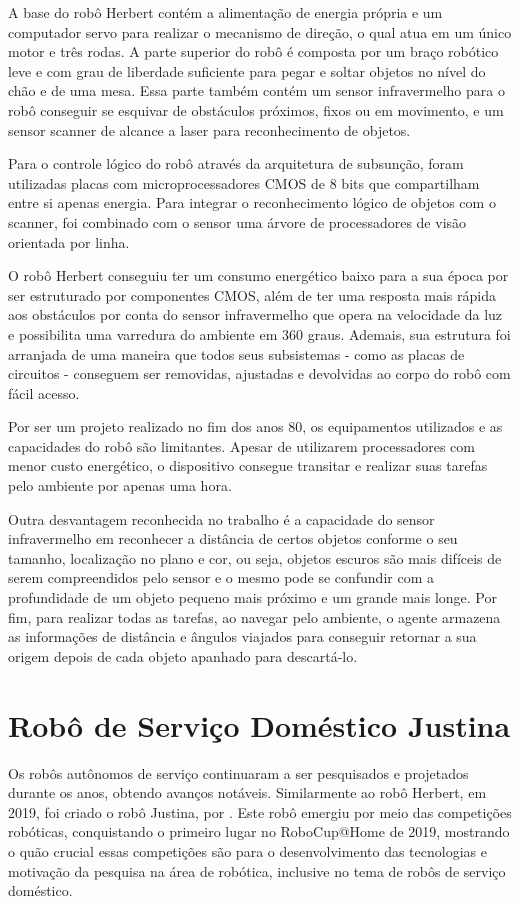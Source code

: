 A base do robô Herbert contém a alimentação de energia própria e um computador servo para realizar o mecanismo de direção, o qual atua em um único motor e três rodas. A parte superior do robô é composta por um braço robótico leve e com grau de liberdade suficiente para pegar e soltar objetos no nível do chão e de uma mesa. Essa parte também contém um sensor infravermelho para o robô conseguir se esquivar de obstáculos próximos, fixos ou em movimento, e um sensor scanner de alcance a laser para reconhecimento de objetos. 

Para o controle lógico do robô através da arquitetura de subsunção, foram utilizadas placas com microprocessadores CMOS de 8 bits  que compartilham entre si apenas energia. Para integrar o reconhecimento lógico de objetos com o scanner, foi combinado com o sensor uma árvore de processadores de visão orientada por linha. 

O robô Herbert conseguiu ter um consumo energético baixo para a sua época por ser estruturado por componentes CMOS, além de ter uma resposta mais rápida aos obstáculos por conta do sensor infravermelho que opera na velocidade da luz e possibilita uma varredura do ambiente em 360 graus. Ademais, sua estrutura foi arranjada de uma maneira que todos seus subsistemas - como as placas de circuitos -  conseguem ser removidas, ajustadas e devolvidas ao corpo do robô com fácil acesso. 

Por ser um projeto realizado no fim dos anos 80, os equipamentos utilizados e as capacidades do robô são limitantes. Apesar de utilizarem processadores com menor custo energético, o dispositivo consegue transitar e realizar suas tarefas pelo ambiente por apenas uma hora. 

Outra desvantagem reconhecida no trabalho é a capacidade do sensor infravermelho em reconhecer a distância de certos objetos conforme o seu tamanho, localização no plano e cor, ou seja, objetos escuros são mais difíceis de serem compreendidos pelo sensor e o mesmo pode se confundir com a profundidade de um objeto pequeno mais próximo e um grande mais longe. Por fim, para realizar todas as tarefas, ao navegar pelo ambiente, o agente armazena as informações de distância e ângulos viajados para conseguir retornar a sua origem depois de cada objeto apanhado para descartá-lo.

\section{Robô de Serviço Doméstico Justina}
Os robôs autônomos de serviço continuaram a ser pesquisados e projetados durante os anos, obtendo avanços notáveis. Similarmente ao robô Herbert, em 2019, foi criado o robô Justina, por \citet{justina:2019}. Este robô emergiu por meio das competições robóticas, conquistando o primeiro lugar no RoboCup@Home de 2019, mostrando o quão crucial essas competições são para o desenvolvimento das tecnologias e motivação da pesquisa na área de robótica, inclusive no tema de robôs de serviço doméstico. 

